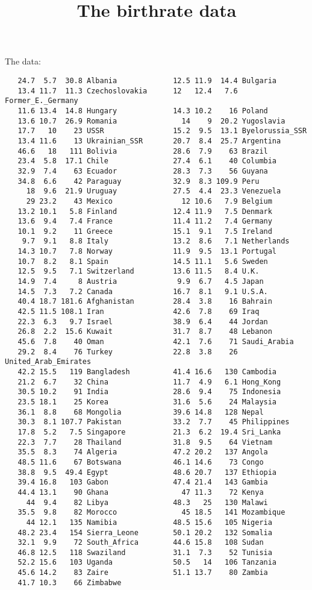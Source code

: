 \documentclass{article}
\title{The birthrate data}
\begin{document}
\maketitle
The data:
\begin{verbatim}
   24.7  5.7  30.8 Albania             12.5 11.9  14.4 Bulgaria
   13.4 11.7  11.3 Czechoslovakia      12   12.4   7.6 Former_E._Germany
   11.6 13.4  14.8 Hungary             14.3 10.2    16 Poland
   13.6 10.7  26.9 Romania               14    9  20.2 Yugoslavia
   17.7   10    23 USSR                15.2  9.5  13.1 Byelorussia_SSR
   13.4 11.6    13 Ukrainian_SSR       20.7  8.4  25.7 Argentina
   46.6   18   111 Bolivia             28.6  7.9    63 Brazil
   23.4  5.8  17.1 Chile               27.4  6.1    40 Columbia
   32.9  7.4    63 Ecuador             28.3  7.3    56 Guyana
   34.8  6.6    42 Paraguay            32.9  8.3 109.9 Peru
     18  9.6  21.9 Uruguay             27.5  4.4  23.3 Venezuela
     29 23.2    43 Mexico                12 10.6   7.9 Belgium
   13.2 10.1   5.8 Finland             12.4 11.9   7.5 Denmark
   13.6  9.4   7.4 France              11.4 11.2   7.4 Germany
   10.1  9.2    11 Greece              15.1  9.1   7.5 Ireland
    9.7  9.1   8.8 Italy               13.2  8.6   7.1 Netherlands
   14.3 10.7   7.8 Norway              11.9  9.5  13.1 Portugal
   10.7  8.2   8.1 Spain               14.5 11.1   5.6 Sweden
   12.5  9.5   7.1 Switzerland         13.6 11.5   8.4 U.K.
   14.9  7.4     8 Austria              9.9  6.7   4.5 Japan
   14.5  7.3   7.2 Canada              16.7  8.1   9.1 U.S.A.
   40.4 18.7 181.6 Afghanistan         28.4  3.8    16 Bahrain
   42.5 11.5 108.1 Iran                42.6  7.8    69 Iraq
   22.3  6.3   9.7 Israel              38.9  6.4    44 Jordan
   26.8  2.2  15.6 Kuwait              31.7  8.7    48 Lebanon
   45.6  7.8    40 Oman                42.1  7.6    71 Saudi_Arabia
   29.2  8.4    76 Turkey              22.8  3.8    26 United_Arab_Emirates
   42.2 15.5   119 Bangladesh          41.4 16.6   130 Cambodia
   21.2  6.7    32 China               11.7  4.9   6.1 Hong_Kong
   30.5 10.2    91 India               28.6  9.4    75 Indonesia
   23.5 18.1    25 Korea               31.6  5.6    24 Malaysia
   36.1  8.8    68 Mongolia            39.6 14.8   128 Nepal
   30.3  8.1 107.7 Pakistan            33.2  7.7    45 Philippines
   17.8  5.2   7.5 Singapore           21.3  6.2  19.4 Sri_Lanka
   22.3  7.7    28 Thailand            31.8  9.5    64 Vietnam
   35.5  8.3    74 Algeria             47.2 20.2   137 Angola
   48.5 11.6    67 Botswana            46.1 14.6    73 Congo
   38.8  9.5  49.4 Egypt               48.6 20.7   137 Ethiopia
   39.4 16.8   103 Gabon               47.4 21.4   143 Gambia
   44.4 13.1    90 Ghana                 47 11.3    72 Kenya
     44  9.4    82 Libya               48.3   25   130 Malawi
   35.5  9.8    82 Morocco               45 18.5   141 Mozambique
     44 12.1   135 Namibia             48.5 15.6   105 Nigeria
   48.2 23.4   154 Sierra_Leone        50.1 20.2   132 Somalia
   32.1  9.9    72 South_Africa        44.6 15.8   108 Sudan
   46.8 12.5   118 Swaziland           31.1  7.3    52 Tunisia
   52.2 15.6   103 Uganda              50.5   14   106 Tanzania
   45.6 14.2    83 Zaire               51.1 13.7    80 Zambia
   41.7 10.3    66 Zimbabwe
\end{verbatim}
\end{document}
